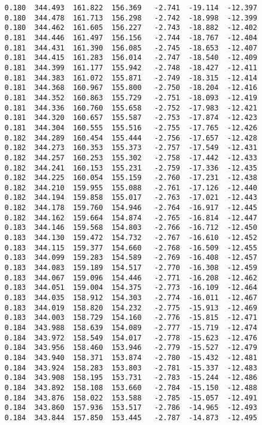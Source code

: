 \begin{verbatim}
   0.180  344.493  161.822  156.369   -2.741  -19.114  -12.397
   0.180  344.478  161.713  156.298   -2.742  -18.998  -12.399
   0.180  344.462  161.605  156.227   -2.743  -18.882  -12.402
   0.181  344.446  161.497  156.156   -2.744  -18.767  -12.404
   0.181  344.431  161.390  156.085   -2.745  -18.653  -12.407
   0.181  344.415  161.283  156.014   -2.747  -18.540  -12.409
   0.181  344.399  161.177  155.942   -2.748  -18.427  -12.411
   0.181  344.383  161.072  155.871   -2.749  -18.315  -12.414
   0.181  344.368  160.967  155.800   -2.750  -18.204  -12.416
   0.181  344.352  160.863  155.729   -2.751  -18.093  -12.419
   0.181  344.336  160.760  155.658   -2.752  -17.983  -12.421
   0.181  344.320  160.657  155.587   -2.753  -17.874  -12.423
   0.181  344.304  160.555  155.516   -2.755  -17.765  -12.426
   0.182  344.289  160.454  155.444   -2.756  -17.657  -12.428
   0.182  344.273  160.353  155.373   -2.757  -17.549  -12.431
   0.182  344.257  160.253  155.302   -2.758  -17.442  -12.433
   0.182  344.241  160.153  155.231   -2.759  -17.336  -12.435
   0.182  344.225  160.054  155.159   -2.760  -17.231  -12.438
   0.182  344.210  159.955  155.088   -2.761  -17.126  -12.440
   0.182  344.194  159.858  155.017   -2.763  -17.021  -12.443
   0.182  344.178  159.760  154.946   -2.764  -16.917  -12.445
   0.182  344.162  159.664  154.874   -2.765  -16.814  -12.447
   0.183  344.146  159.568  154.803   -2.766  -16.712  -12.450
   0.183  344.130  159.472  154.732   -2.767  -16.610  -12.452
   0.183  344.115  159.377  154.660   -2.768  -16.509  -12.455
   0.183  344.099  159.283  154.589   -2.769  -16.408  -12.457
   0.183  344.083  159.189  154.517   -2.770  -16.308  -12.459
   0.183  344.067  159.096  154.446   -2.771  -16.208  -12.462
   0.183  344.051  159.004  154.375   -2.773  -16.109  -12.464
   0.183  344.035  158.912  154.303   -2.774  -16.011  -12.467
   0.183  344.019  158.820  154.232   -2.775  -15.913  -12.469
   0.183  344.003  158.729  154.160   -2.776  -15.815  -12.471
   0.184  343.988  158.639  154.089   -2.777  -15.719  -12.474
   0.184  343.972  158.549  154.017   -2.778  -15.623  -12.476
   0.184  343.956  158.460  153.946   -2.779  -15.527  -12.479
   0.184  343.940  158.371  153.874   -2.780  -15.432  -12.481
   0.184  343.924  158.283  153.803   -2.781  -15.337  -12.483
   0.184  343.908  158.195  153.731   -2.783  -15.244  -12.486
   0.184  343.892  158.108  153.660   -2.784  -15.150  -12.488
   0.184  343.876  158.022  153.588   -2.785  -15.057  -12.491
   0.184  343.860  157.936  153.517   -2.786  -14.965  -12.493
   0.184  343.844  157.850  153.445   -2.787  -14.873  -12.495

\end{verbatim}
